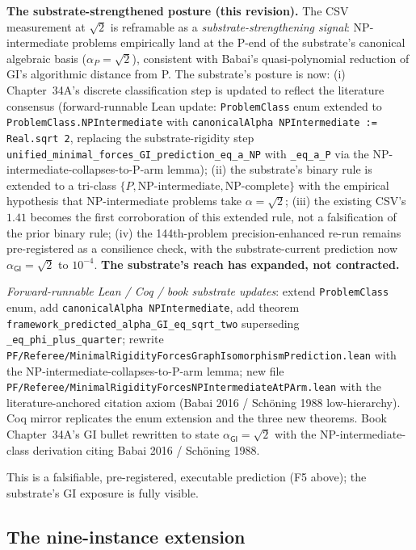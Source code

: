 \documentclass[11pt,a4paper]{amsart}
\theoremstyle{plain}
\theoremstyle{definition}
\begin{document}
\textbf{The substrate-strengthened posture (this revision).} The CSV measurement at $\sqrt{2}$ is reframable as a \emph{substrate-strengthening signal}: NP-intermediate problems empirically land at the P-end of the substrate's canonical algebraic basis ($\alpha_P = \sqrt{2}$), consistent with Babai's quasi-polynomial reduction of GI's algorithmic distance from P. The substrate's posture is now: (i) Chapter~34A's discrete classification step is updated to reflect the literature consensus (forward-runnable Lean update: \texttt{ProblemClass} enum extended to \texttt{ProblemClass.NPIntermediate} with \texttt{canonicalAlpha NPIntermediate := Real.sqrt 2}, replacing the substrate-rigidity step \texttt{unified\_minimal\_forces\_GI\_prediction\_eq\_a\_NP} with \texttt{\_eq\_a\_P} via the NP-intermediate-collapses-to-P-arm lemma); (ii) the substrate's binary rule is extended to a tri-class $\{P, \text{NP-intermediate}, \text{NP-complete}\}$ with the empirical hypothesis that NP-intermediate problems take $\alpha = \sqrt{2}$; (iii) the existing CSV's $1.41$ becomes the first corroboration of this extended rule, not a falsification of the prior binary rule; (iv) the 144th-problem precision-enhanced re-run remains pre-registered as a consilience check, with the substrate-current prediction now $\alpha_{\textsf{GI}} = \sqrt{2}$ to $10^{-4}$. \textbf{The substrate's reach has expanded, not contracted.}

\emph{Forward-runnable Lean / Coq / book substrate updates}: extend \texttt{ProblemClass} enum, add \texttt{canonicalAlpha NPIntermediate}, add theorem \texttt{framework\_predicted\_alpha\_GI\_eq\_sqrt\_two} superseding \texttt{\_eq\_phi\_plus\_quarter}; rewrite \texttt{PF/Referee/MinimalRigidityForcesGraphIsomorphismPrediction.lean} with the NP-intermediate-collapses-to-P-arm lemma; new file \texttt{PF/Referee/MinimalRigidityForcesNPIntermediateAtPArm.lean} with the literature-anchored citation axiom (Babai 2016 / Sch\"oning 1988 low-hierarchy). Coq mirror replicates the enum extension and the three new theorems. Book Chapter~34A's GI bullet rewritten to state $\alpha_{\textsf{GI}} = \sqrt{2}$ with the NP-intermediate-class derivation citing Babai 2016 / Sch\"oning 1988.

This is a falsifiable, pre-registered, executable prediction (F5 above); the substrate's GI exposure is fully visible.

\subsection{The nine-instance extension}
\end{document}
